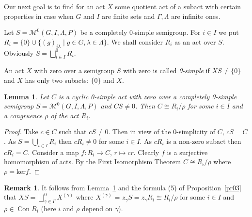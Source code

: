 \documentclass{birkau}
\numberwithin{equation}{section}
\theoremstyle{plain}
\newtheorem{lemma}[theorem]{Lemma}
\theoremstyle{definition}
\newtheorem{remark}[theorem]{Remark}
\DeclareMathOperator{\Con}{Con}
\begin{document}
	Our next goal is to find for an act $X$ some quotient act of a subact with certain properties in case when $G$ and $I$ are finite sets and $\Gamma, \Lambda$ are infinite ones.
	
	Let $S=\mathcal{M}^0(G,I,\Lambda,P)$ be a completely 0-simple semigroup. For $i \in I$ we put $R_i = \{0\} \cup \{(g)_{i\lambda} \mid g \in G, \lambda \in \Lambda\}$. We shall consider $R_i$ as an act over $S$. Obviously $S = \bigsqcup_{i \in I}^0 R_i$.
	
	An act $X$ with zero over a semigroup $S$ with zero is called \textit{0-simple} if $XS \neq \{0\}$ and $X$ has only two subacts: $\{0\}$ and $X$.
	
	\begin{lemma} \label{lemma:A}
	    Let $C$ is a cyclic 0-simple act with zero over a completely 0-simple semigroup $S=\mathcal{M}^0(G,I,\Lambda,P)$ and $CS \neq 0$. Then $C \cong R_i/\rho$ for some $i \in I$ and a congruence $\rho$ of the act $R_i$.
	\end{lemma}
	\begin{proof}
	    Take $c \in C$ such that $cS \neq 0$. Then in view of the 0-simplicity of $C$, $cS=C$. As $S = \bigcup_{i \in I} R_i$ then $cR_i \neq 0$ for some $i \in I$. As $cR_i$ is a non-zero subact then $cR_i = C$. Consider a map $f:R_i \to C$, $r \mapsto cr$. Clearly $f$ is a surjective homomorphism of acts. By the First Isomorphism Theorem $C \cong R_i/\rho$ where $\rho = \text{ker} f$.
	\end{proof}
	
	\begin{remark}
	    It follows from Lemma~\ref{lemma:A} and the formula (5) of Proposition~\ref{pr03} that $XS = \bigsqcup_{\gamma \in \Gamma}^{0} X^{(\gamma)}$ where $X^{(\gamma)}$ = $z_{\gamma}S = z_{\gamma}R_i \cong R_i/\rho$ for some $i \in I$ and $\rho \in \Con R_i$ (here $i$ and $\rho$ depend on $\gamma$).
	\end{remark}
	
\end{document}
